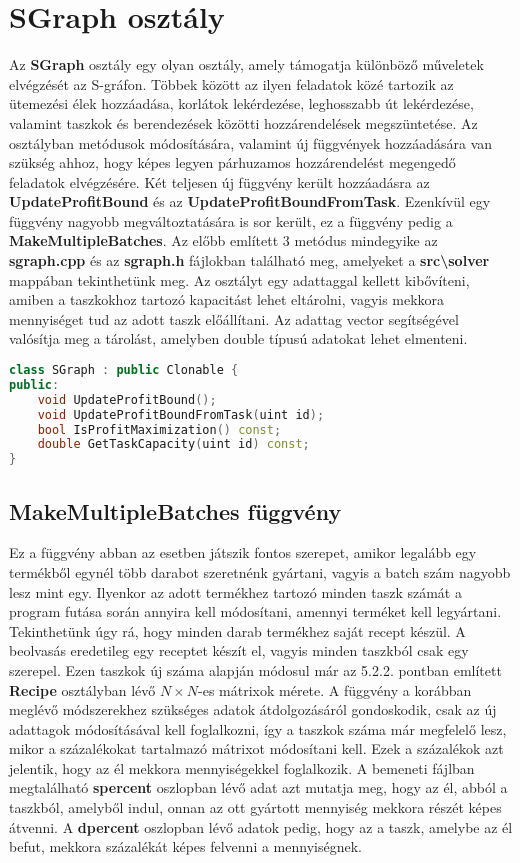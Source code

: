 \section{SGraph osztály}
Az \textbf{SGraph} osztály egy olyan osztály, amely támogatja különböző műveletek elvégzését az S-gráfon.
Többek között az ilyen feladatok közé tartozik az ütemezési élek hozzáadása, korlátok lekérdezése, leghosszabb út lekérdezése, valamint taszkok és berendezések közötti hozzárendelések megszüntetése.
Az osztályban metódusok módosítására, valamint új függvények hozzáadására van szükség ahhoz, hogy képes legyen párhuzamos hozzárendelést megengedő feladatok elvégzésére.
Két teljesen új függvény került hozzáadásra az \textbf{UpdateProfitBound} és az \textbf{UpdateProfitBoundFromTask}.
Ezenkívül egy függvény nagyobb megváltoztatására is sor került, ez a függvény pedig a \textbf{MakeMultipleBatches}.
Az előbb említett 3 metódus mindegyike az \textbf{sgraph.cpp} és az \textbf{sgraph.h} fájlokban található meg, amelyeket a \textbf{src\textbackslash solver} mappában tekinthetünk meg.
Az osztályt egy adattaggal kellett kibővíteni, amiben a taszkokhoz tartozó kapacitást lehet eltárolni, vagyis mekkora mennyiséget tud az adott taszk előállítani.
Az adattag vector segítségével valósítja meg a tárolást, amelyben double típusú adatokat lehet elmenteni.
\begin{lstlisting}[caption={SGraph osztály header fájljában lévő új függvények deklarációja},language=c++,numbers=none]
class SGraph : public Clonable {
public:
	void UpdateProfitBound();
	void UpdateProfitBoundFromTask(uint id);
	bool IsProfitMaximization() const;
	double GetTaskCapacity(uint id) const;	
}
\end{lstlisting}

\subsection{MakeMultipleBatches függvény}
Ez a függvény abban az esetben játszik fontos szerepet, amikor legalább egy termékből egynél több darabot szeretnénk gyártani, vagyis a batch szám nagyobb lesz mint egy.
Ilyenkor az adott termékhez tartozó minden taszk számát a program futása során annyira kell módosítani, amennyi terméket kell legyártani.
Tekinthetünk úgy rá, hogy minden darab termékhez saját recept készül.
A beolvasás eredetileg egy receptet készít el, vagyis minden taszkból csak egy szerepel.
Ezen taszkok új száma alapján módosul már az 5.2.2. pontban említett \textbf{Recipe} osztályban lévő $N\times N$-es mátrixok mérete.
A függvény a korábban meglévő módszerekhez szükséges adatok átdolgozásáról gondoskodik, csak az új adattagok módosításával kell foglalkozni, így a taszkok száma már megfelelő lesz, mikor a százalékokat tartalmazó mátrixot módosítani kell.
Ezek a százalékok azt jelentik, hogy az él mekkora mennyiségekkel foglalkozik.
A bemeneti fájlban megtalálható \textbf{s\textunderscore percent} oszlopban lévő adat azt mutatja meg, hogy az él, abból a taszkból, amelyből indul, onnan az ott gyártott mennyiség mekkora részét képes átvenni.
A \textbf{d\textunderscore percent} oszlopban lévő adatok pedig, hogy az a taszk, amelybe az él befut, mekkora százalékát képes felvenni a mennyiségnek. 

